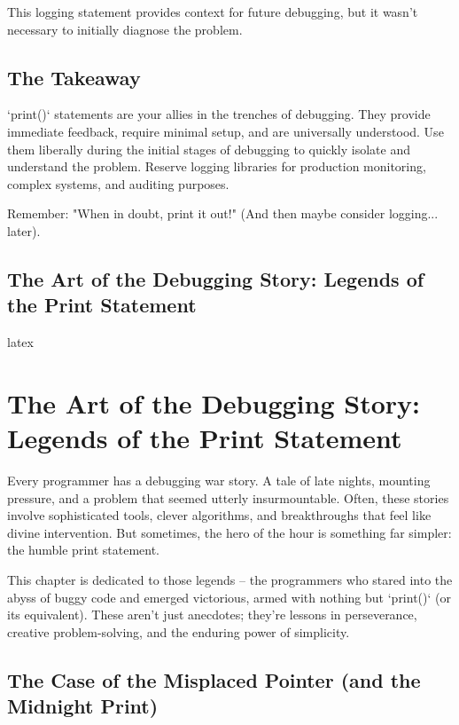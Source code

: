 \documentclass{article}
\begin{document}
This logging statement provides context for future debugging, but it wasn't necessary to initially diagnose the problem.

\section*{The Takeaway}

`print()` statements are your allies in the trenches of debugging. They provide immediate feedback, require minimal setup, and are universally understood. Use them liberally during the initial stages of debugging to quickly isolate and understand the problem. Reserve logging libraries for production monitoring, complex systems, and auditing purposes.

Remember: "When in doubt, print it out!" (And then maybe consider logging... later).

\newpage

\section*{The Art of the Debugging Story: Legends of the Print Statement} %
\label{chapter-1-7-The_Art_of_the_Debugging_Story__Legends}

latex
\chapter{The Art of the Debugging Story: Legends of the Print Statement}

Every programmer has a debugging war story. A tale of late nights, mounting pressure, and a problem that seemed utterly insurmountable. Often, these stories involve sophisticated tools, clever algorithms, and breakthroughs that feel like divine intervention. But sometimes, the hero of the hour is something far simpler: the humble print statement.

This chapter is dedicated to those legends – the programmers who stared into the abyss of buggy code and emerged victorious, armed with nothing but `print()` (or its equivalent). These aren't just anecdotes; they're lessons in perseverance, creative problem-solving, and the enduring power of simplicity.

\section*{The Case of the Misplaced Pointer (and the Midnight Print)}
\end{document}
